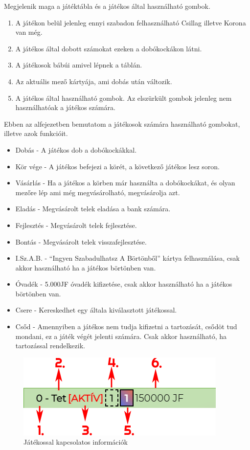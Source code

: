 Megjelenik maga a játéktábla és a játékos által használható gombok.
\begin{enumerate}
	\item A játékon belül jelenleg ennyi szabadon felhasználható Csillag illetve Korona van még.
	\item A játékos által dobott számokat ezeken a dobókockákon látni.
	\item A játékosok bábúi amivel lépnek a táblán.
	\item Az aktuális mező kártyája, ami dobás után változik.
	\item A játékos által használható gombok. Az elszürkült gombok jelenleg nem használhatóak a játékos számára.
\end{enumerate}


Ebben az alfejezetben bemutatom a játékosok számára használható gombokat, illetve azok funkcióit.

\begin{itemize}
	\item Dobás - A játékos dob a dobókockákkal.
	\item Kör vége - A játékos befejezi a körét, a következő játékos lesz soron.
	\item Vásárlás - Ha a játékos a körben már használta a dobókockákat, és olyan mezőre lép ami még megvásárolható, megvásárolja azt.
	\item Eladás - Megvásárolt telek eladása a bank számára.
	\item Fejlesztés - Megvásárolt telek fejlesztése.
	\item Bontás - Megvásárolt telek visszafejlesztése.
	\item I.Sz.A.B. - “Ingyen Szabadulhatsz A Börtönből” kártya felhasználása, csak akkor használható ha a játékos börtönben van.
	\item Óvadék - 5.000JF óvadék kifizetése, csak akkor használható ha a játékos börtönben van.
	\item Csere - Kereskedhet egy általa kiválasztott játékossal.
	\item Csőd - Amennyiben a játékos nem tudja kifizetni a tartozását, csődöt tud mondani, ez a játék végét jelenti számára. Csak akkor használható, ha tartozással rendelkezik.
\end{itemize}


\begin{figure}[h!]
\centering
\includegraphics[scale=0.6]{images/Nevtelen-7.png}
\caption{Játékossal kapcsolatos információk}
\label{fig:stats}
\end{figure}

